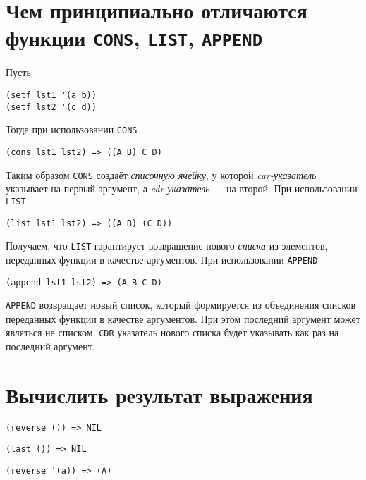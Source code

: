 
\section{Чем принципиально отличаются функции \texttt{CONS}, \texttt{LIST}, \texttt{APPEND}}

Пусть
\begin{lstlisting}
(setf lst1 '(a b))
(setf lst2 '(c d))
\end{lstlisting}
Тогда при использовании \verb|CONS|
\begin{lstlisting}
(cons lst1 lst2) => ((A B) C D) 
\end{lstlisting}
Таким образом \verb|CONS| создаёт \textit{списочную ячейку}, у которой \textit{car-указатель} указывает на первый аргумент, а \textit{cdr-указатель} --- на второй.
При использовании \verb|LIST|
\begin{lstlisting}
(list lst1 lst2) => ((A B) (C D)) 
\end{lstlisting}
Получаем, что \verb|LIST| гарантирует возвращение нового \textit{списка} из элементов, переданных функции в качестве аргументов.
При использовании \verb|APPEND|
\begin{lstlisting}
(append lst1 lst2) => (A B C D)
\end{lstlisting}
\verb|APPEND| возвращает новый список, который формируется из объединения списков переданных функции в качестве аргументов. При этом последний аргумент может являться не списком. \verb|CDR| указатель нового списка будет указывать как раз на последний аргумент.


\section{Вычислить результат выражения}

\problem \hfill

\begin{lstlisting}
(reverse ()) => NIL
\end{lstlisting}


\problem \hfill

\begin{lstlisting}
(last ()) => NIL
\end{lstlisting}


\problem \hfill

\begin{lstlisting}
(reverse '(a)) => (A)
\end{lstlisting}


